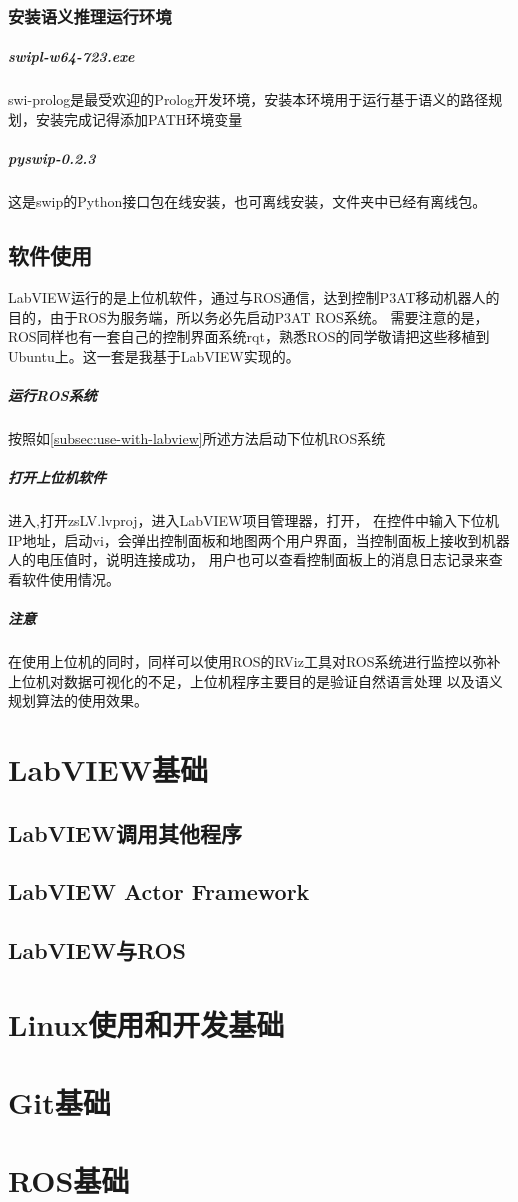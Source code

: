 \documentclass[a4paper,twoside,cs4size,fancyhdr,notitlepage]{ctexart}
\begin{document}
\subsubsection{安装语义推理运行环境}
\subparagraph{swipl-w64-723.exe}
swi-prolog是最受欢迎的Prolog开发环境，安装本环境用于运行基于语义的路径规划，安装完成记得添加PATH环境变量
\subparagraph{pyswip-0.2.3}
这是swip的Python接口包在线安装，也可离线安装，文件夹中已经有离线包。
\subsection{软件使用}
LabVIEW运行的是上位机软件，通过与ROS通信，达到控制P3AT移动机器人的目的，由于ROS为服务端，所以务必先启动P3AT ROS系统。
需要注意的是，ROS同样也有一套自己的控制界面系统rqt，熟悉ROS的同学敬请把这些移植到Ubuntu上。这一套是我基于LabVIEW实现的。
\subparagraph{运行ROS系统}
按照如\ref{subsec:use-with-labview}所述方法启动下位机ROS系统
\subparagraph{打开上位机软件}
进入,打开zsLV.lvproj，进入LabVIEW项目管理器，打开，
在控件中输入下位机IP地址，启动vi，会弹出控制面板和地图两个用户界面，当控制面板上接收到机器人的电压值时，说明连接成功，
用户也可以查看控制面板上的消息日志记录来查看软件使用情况。
\subparagraph{注意}
在使用上位机的同时，同样可以使用ROS的RViz工具对ROS系统进行监控以弥补上位机对数据可视化的不足，上位机程序主要目的是验证自然语言处理
以及语义规划算法的使用效果。
\appendix

\section{LabVIEW基础}
\subsection{LabVIEW调用其他程序}
\subsection{LabVIEW Actor Framework}
\subsection{LabVIEW与ROS}
\section{Linux使用和开发基础}
\section{Git基础}
\section{ROS基础}
\end{document}
